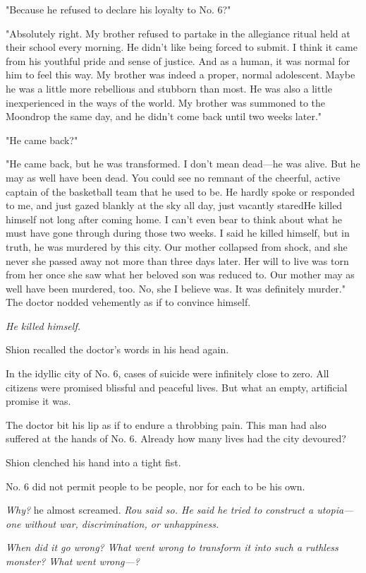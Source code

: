 "Because he refused to declare his loyalty to No. 6?"

"Absolutely right. My brother refused to partake in the allegiance
ritual held at their school every morning. He didn't like being forced
to submit. I think it came from his youthful pride and sense of justice.
And as a human, it was normal for him to feel this way. My brother was
indeed a proper, normal adolescent. Maybe he was a little more
rebellious and stubborn than most. He was also a little inexperienced in
the ways of the world. My brother was summoned to the Moondrop the same
day, and he didn't come back until two weeks later."

"He came back?"

"He came back, but he was transformed. I don't mean dead---he was alive.
But he may as well have been dead. You could see no remnant of the
cheerful, active captain of the basketball team that he used to be. He
hardly spoke or responded to me, and just gazed blankly at the sky all
day, just vacantly stared\el He killed himself not long after coming
home. I can't even bear to think about what he must have gone through
during those two weeks. I said he killed himself, but in truth, he was
murdered by this city. Our mother collapsed from shock, and she never\el 
she passed away not more than three days later. Her will to live was
torn from her once she saw what her beloved son was reduced to. Our
mother may as well have been murdered, too. No, she I believe was. It
was definitely murder." The doctor nodded vehemently as if to convince
himself.

\emph{He killed himself.}

Shion recalled the doctor's words in his head again.

In the idyllic city of No. 6, cases of suicide were infinitely close to
zero. All citizens were promised blissful and peaceful lives. But what
an empty, artificial promise it was.

The doctor bit his lip as if to endure a throbbing pain. This man had
also suffered at the hands of No. 6. Already how many lives had the city
devoured?

Shion clenched his hand into a tight fist.

No. 6 did not permit people to be people, nor for each to be his own.

\emph{Why?} he almost screamed. \emph{Rou said so. He said he tried to construct a
utopia---one without war, discrimination, or unhappiness.}

\emph{When did it go wrong? What went wrong to transform it into such a
ruthless monster? What went wrong---?}

